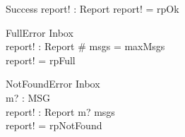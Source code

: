 \documentclass{article}
\begin{document}
\begin{schema}{Success}
  report! : Report
\where
  report! = rpOk
\end{schema}

\begin{schema}{FullError}
  \Xi Inbox \\
  report! : Report
\where
  \# msgs = maxMsgs \\
  report! = rpFull
\end{schema}

\begin{schema}{NotFoundError}
  \Xi Inbox \\
  m? : MSG \\
  report! : Report
\where
  m? \notin msgs \\
  report! = rpNotFound
\end{schema}
\end{document}
